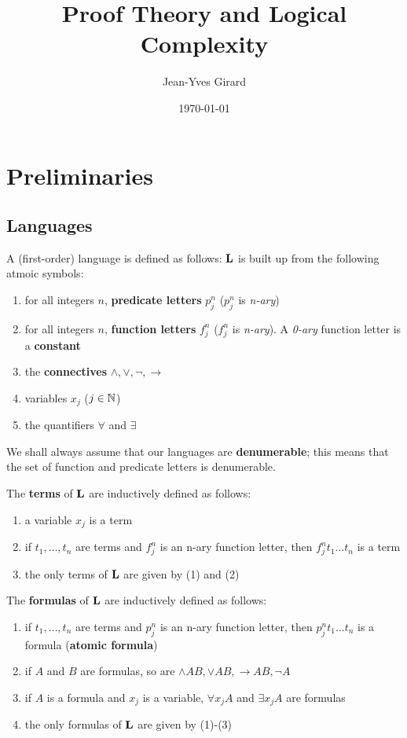 \documentclass[11pt]{article}
\author{Jean-Yves Girard}
\date{\today}
\title{Proof Theory and Logical Complexity}
\begin{document}
\maketitle
\tableofcontents \clearpage
\section{Preliminaries}
\label{sec:orga0d278e}
\subsection{Languages}
\label{sec:org25bb01f}
A (first-order) language is defined as follows: \(\operatorname{\textbf{L}}\) is built up from the
following atmoic symbols:
\begin{enumerate}
\item for all integers \(n\), \textbf{predicate letters} \(p_j^n\) (\(p_j^n\) is \emph{n-ary})
\item for all integers \(n\), \textbf{function letters} \(f_j^n\) (\(f_j^n\) is \emph{n-ary}). A \emph{0-ary}
function letter is a \textbf{constant}
\item the \textbf{connectives} \(\wedge,\vee,\neg,\to\)
\item variables \(x_j\) (\(j\in\mathbb{N}\))
\item the quantifiers \(\forall\) and \(\exists\)
\end{enumerate}


We shall always assume that our languages are \textbf{denumerable}; this means that the
set of function and predicate letters is denumerable.

The \textbf{terms} of \(\operatorname{\textbf{L}}\) are inductively defined as follows:
\begin{enumerate}
\item a variable \(x_j\) is a term
\item if \(t_1,\dots,t_n\) are terms and \(f_j^n\) is an n-ary function letter, then
\(f_j^nt_1\dots t_n\) is a term
\item the only terms of \(\operatorname{\textbf{L}}\) are given by (1) and (2)
\end{enumerate}


The \textbf{formulas} of \(\operatorname{\textbf{L}}\) are inductively defined as follows:
\begin{enumerate}
\item if \(t_1,\dots,t_n\) are terms and \(p_j^n\) is an n-ary function letter, then
\(p_j^nt_1\dots t_n\) is a formula (\textbf{atomic formula})
\item if \(A\) and \(B\) are formulas, so are \(\wedge AB,\vee AB,\to AB,\neg A\)
\item if \(A\) is a formula and \(x_j\) is a variable, \(\forall x_jA\) and \(\exists
   x_jA\) are formulas
\item the only formulas of \(\operatorname{\textbf{L}}\) are given by (1)-(3)
\end{enumerate}
\end{document}
